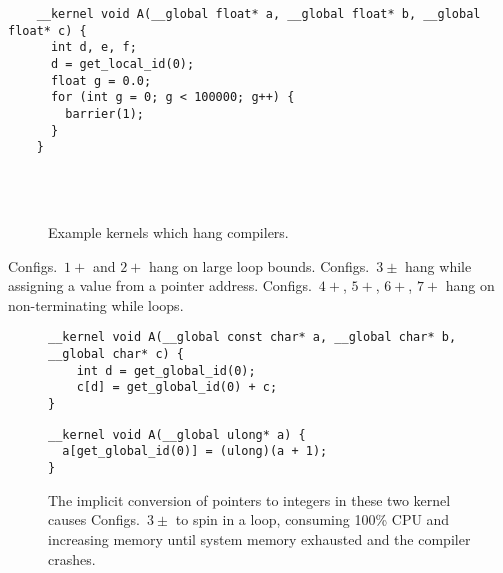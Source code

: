 \newsavebox{\IntelOptCompilerHang}
\begin{lrbox}{\IntelOptCompilerHang}
  \hspace{1.5em}
  \begin{lstlisting}
    __kernel void A(__global float* a, __global float* b, __global float* c) {
      int d, e, f;
      d = get_local_id(0);
      float g = 0.0;
      for (int g = 0; g < 100000; g++) {
        barrier(1);
      }
    }
  \end{lstlisting}
\end{lrbox}

\begin{figure}
  \centering %
  \\%
  \\%
  \caption{Example kernels which hang compilers.}%
  \label{lst:compiler-hangs}%
\end{figure}

Configs.\ $1+$ and $2+$ hang on large loop bounds. Configs.\ $3\pm$ hang while assigning a value from a pointer address. Configs.\ $4+$, $5+$, $6+$, $7+$ hang on non-terminating while loops.

\begin{figure}
\begin{lstlisting}
__kernel void A(__global const char* a, __global char* b, __global char* c) {
	int d = get_global_id(0);
	c[d] = get_global_id(0) + c;
}
\end{lstlisting}
\begin{lstlisting}
__kernel void A(__global ulong* a) {
  a[get_global_id(0)] = (ulong)(a + 1);
}
\end{lstlisting}
\caption{The implicit conversion of pointers to integers in these two kernel causes Configs.\ $3\pm$ to spin in a loop, consuming 100\% CPU and increasing memory until system memory exhausted and the compiler crashes.}
\end{figure}

